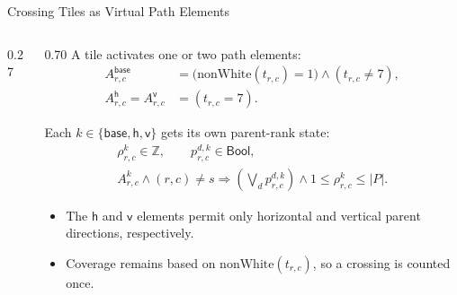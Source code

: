 \documentclass[aspectratio=169,10pt]{beamer}
\newcommand{\kind}[1]{\mathsf{#1}}
\begin{document}
\begin{frame}{Crossing Tiles as Virtual Path Elements}
  \begin{columns}[c,totalwidth=\textwidth]
    \begin{column}{0.27\textwidth}
      \centering
      
    \end{column}
    \begin{column}{0.70\textwidth}
      A tile activates one or two path elements:
      \[
        \begin{aligned}
          A^{\kind{base}}_{r,c}
          &=\bigl(\mathrm{nonWhite}(t_{r,c})=1\bigr)
            \wedge(t_{r,c}\ne 7),\\
          A^{\kind{h}}_{r,c}=A^{\kind{v}}_{r,c}
          &=(t_{r,c}=7).
        \end{aligned}
      \]

      Each \(k\in\{\kind{base},\kind{h},\kind{v}\}\) gets its own
      parent-rank state:
      \[
        \begin{gathered}
          \rho^k_{r,c}\in\mathbb Z,
          \qquad
          p^{d,k}_{r,c}\in\mathsf{Bool},\\
          A^k_{r,c}\wedge(r,c)\ne s
          \Longrightarrow
          \left(\bigvee_d p^{d,k}_{r,c}\right)
          \wedge 1\le\rho^k_{r,c}\le |P|.
        \end{gathered}
      \]

      \begin{itemize}
        \item The \(\kind{h}\) and \(\kind{v}\) elements permit only
          horizontal and vertical parent directions, respectively.
        \item Coverage remains based on \(\mathrm{nonWhite}(t_{r,c})\),
          so a crossing is counted once.
      \end{itemize}
    \end{column}
  \end{columns}
\end{frame}
\end{document}
